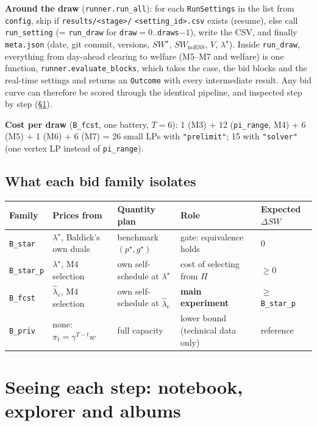 \documentclass[10pt,a4paper]{article}
\newcommand{\code}[1]{\texttt{#1}}
\newcommand{\lamstar}{\lambda^{\star}}
\newcommand{\lamhat}{\hat\lambda}
\begin{document}
\textbf{Around the draw} (\code{runner.run\_all}): for each \code{RunSettings} in the list from
\code{config}, skip if \code{results/<stage>/} \code{<setting\_id>.csv} exists (resume), else call
\code{run\_setting} (= \code{run\_draw} for \code{draw}$=0..$\code{draws}$-1$), write the CSV, and finally
\code{meta.json} (date, git commit, versions, $SW^\star$, $SW_{\text{noESS}}$, $V$, $\lamstar$).
Inside \code{run\_draw}, everything from day-ahead clearing to welfare (M5--M7 and welfare) is one function,
\code{runner.evaluate\_blocks}, which takes the case, the bid blocks and the real-time settings and returns an
\code{Outcome} with every intermediate result. Any bid curve can therefore be scored through the identical
pipeline, and inspected step by step (\S\ref{sec:see}).

\textbf{Cost per draw} (\code{B\_fcst}, one battery, $T=6$): 1 (M3) + 12 (\code{pi\_range}, M4) + 6 (M5)
+ 1 (M6) + 6 (M7) = 26 small LPs with \code{"prelimit"}; 15 with \code{"solver"} (one vertex LP instead of
\code{pi\_range}).

\subsection{What each bid family isolates}
\begin{center}\small
\begin{tabular}{@{}lllll@{}}
\toprule
Family & Prices from & Quantity plan & Role & Expected $\Delta SW$ \\
\midrule
\code{B\_star} & $\lamstar$, Baldick's own duals & benchmark $(p^\star,g^\star)$ & gate: equivalence holds & $0$ \\
\code{B\_star\_p} & $\lamstar$, M4 selection & own self-schedule at $\lamstar$ & cost of selecting from $\Pi$ & $\ge 0$ \\
\code{B\_fcst} & $\lamhat_e$, M4 selection & own self-schedule at $\lamhat_e$ & \textbf{main experiment} & $\ge$ \code{B\_star\_p} \\
\code{B\_priv} & none: $\pi_t=\gamma^{T-t}w$ & full capacity & lower bound (technical data only) & reference \\
\bottomrule
\end{tabular}
\end{center}

\section{Seeing each step: notebook, explorer and albums}
\label{sec:see}
\end{document}
